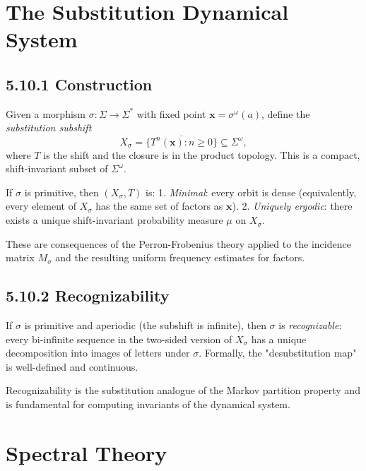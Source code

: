 \section{The Substitution Dynamical System}

\subsection{5.10.1 Construction}

Given a morphism $\sigma: \Sigma \to \Sigma^*$ with fixed point $\mathbf{x} = \sigma^\omega(a)$, define the \textit{substitution subshift}
\[X_\sigma = \overline{\{ T^n(\mathbf{x}) : n \geq 0\} } \subseteq \Sigma^\omega,\]
where $T$ is the shift and the closure is in the product topology. This is a compact, shift-invariant subset of $\Sigma^\omega$.

\begin{theorem}
If $\sigma$ is primitive, then $(X_\sigma, T)$ is:
1. \textit{Minimal}: every orbit is dense (equivalently, every element of $X_\sigma$ has the same set of factors as $\mathbf{x}$).
2. \textit{Uniquely ergodic}: there exists a unique shift-invariant probability measure $\mu$ on $X_\sigma$.

These are consequences of the Perron-Frobenius theory applied to the incidence matrix $M_\sigma$ and the resulting uniform frequency estimates for factors.
\end{theorem}

\subsection{5.10.2 Recognizability}

\begin{theorem}[Mossé 1992]
If $\sigma$ is primitive and aperiodic (the subshift is infinite), then $\sigma$ is \textit{recognizable}: every bi-infinite sequence in the two-sided version of $X_\sigma$ has a unique decomposition into images of letters under $\sigma$. Formally, the "desubstitution map" is well-defined and continuous.

Recognizability is the substitution analogue of the Markov partition property and is fundamental for computing invariants of the dynamical system.
\end{theorem}



\section{Spectral Theory}


